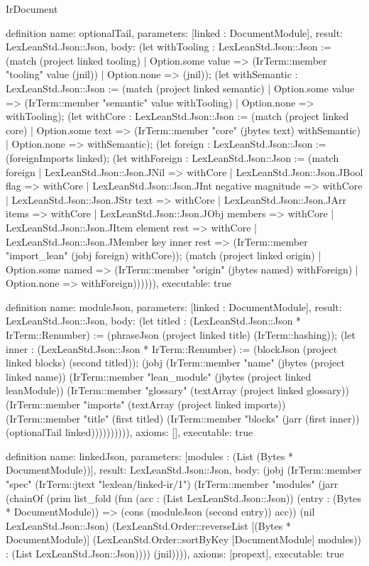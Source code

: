 \begin{lexlean}{IrDocument}
\begin{semanticmodule}
definition{
  name: optionalTail,
  parameters: [linked : DocumentModule],
  result: LexLeanStd.Json::Json,
  body: (let withTooling : LexLeanStd.Json::Json := (match (project linked tooling)
    | Option.some value => (IrTerm::member "tooling" value (jnil))
    | Option.none => (jnil)); (let withSemantic : LexLeanStd.Json::Json := (match (project linked semantic)
    | Option.some value => (IrTerm::member "semantic" value withTooling)
    | Option.none => withTooling); (let withCore : LexLeanStd.Json::Json := (match (project linked core)
    | Option.some text => (IrTerm::member "core" (jbytes text) withSemantic)
    | Option.none => withSemantic); (let foreign : LexLeanStd.Json::Json := (foreignImports linked); (let withForeign : LexLeanStd.Json::Json := (match foreign
    | LexLeanStd.Json::Json.JNil => withCore
    | LexLeanStd.Json::Json.JBool flag => withCore
    | LexLeanStd.Json::Json.JInt negative magnitude => withCore
    | LexLeanStd.Json::Json.JStr text => withCore
    | LexLeanStd.Json::Json.JArr items => withCore
    | LexLeanStd.Json::Json.JObj members => withCore
    | LexLeanStd.Json::Json.JItem element rest => withCore
    | LexLeanStd.Json::Json.JMember key inner rest => (IrTerm::member "import_lean" (jobj foreign) withCore)); (match (project linked origin)
    | Option.some named => (IrTerm::member "origin" (jbytes named) withForeign)
    | Option.none => withForeign)))))),
  executable: true
}

definition{
  name: moduleJson,
  parameters: [linked : DocumentModule],
  result: LexLeanStd.Json::Json,
  body: (let titled : (LexLeanStd.Json::Json * IrTerm::Renumber) := (phraseJson (project linked title) (IrTerm::hashing)); (let inner : (LexLeanStd.Json::Json * IrTerm::Renumber) := (blockJson (project linked blocks) (second titled)); (jobj (IrTerm::member "name" (jbytes (project linked name)) (IrTerm::member "lean_module" (jbytes (project linked leanModule)) (IrTerm::member "glossary" (textArray (project linked glossary)) (IrTerm::member "imports" (textArray (project linked imports)) (IrTerm::member "title" (first titled) (IrTerm::member "blocks" (jarr (first inner)) (optionalTail linked)))))))))),
  axioms: [],
  executable: true
}

definition{
  name: linkedJson,
  parameters: [modules : (List (Bytes * DocumentModule))],
  result: LexLeanStd.Json::Json,
  body: (jobj (IrTerm::member "spec" (IrTerm::jtext "lexlean/linked-ir/1") (IrTerm::member "modules" (jarr (chainOf (prim list_fold (fun (acc : (List LexLeanStd.Json::Json)) (entry : (Bytes * DocumentModule)) => (cons (moduleJson (second entry)) acc)) (nil LexLeanStd.Json::Json) (LexLeanStd.Order::reverseList [(Bytes * DocumentModule)] (LexLeanStd.Order::sortByKey [DocumentModule] modules)) : (List LexLeanStd.Json::Json)))) (jnil)))),
  axioms: [propext],
  executable: true
}


\end{semanticmodule}
\end{lexlean}
